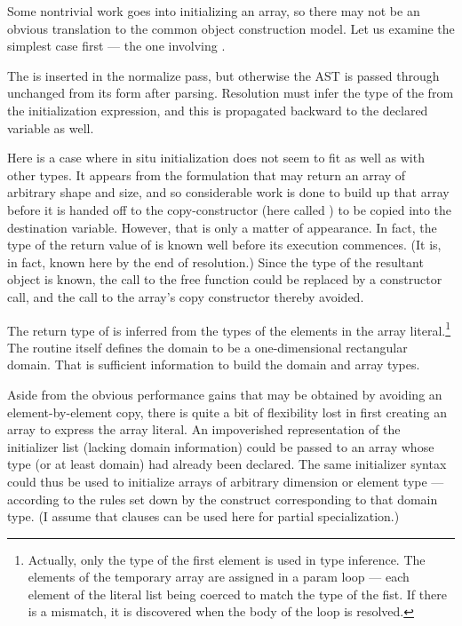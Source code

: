 Some nontrivial work goes into initializing an array, so there may not be an obvious
translation to the common object construction model.  Let us examine the simplest case
first --- the one involving .

The  is inserted in the normalize pass, but otherwise the AST is passed
through unchanged from its form after parsing.  Resolution must infer the type of the
 from the initialization expression, and this is propagated backward to the
declared variable as well.

Here is a case where in situ initialization does not seem to fit as well as with other
types.  It appears from the formulation that  may return an
array of arbitrary shape and size, and so considerable work is done to build up that array
before it is handed off to the copy-constructor (here called ) to be
copied into the destination variable.  However, that is only a matter of appearance.  In
fact, the type of the return value of  is known well before
its execution commences.  (It is, in fact, known here by the end of resolution.)  Since
the type of the resultant object is known, the call to the free function
 could be replaced by a constructor call, and the call to the
array's copy constructor thereby avoided.

The return type of  is inferred from the types of the
elements in the array literal.\footnote{Actually, only the type of the first element is
  used in type inference.  The elements of the temporary array are assigned in a param
  loop --- each element of the literal list being coerced to match the type of the fist.
  If there is a mismatch, it is discovered when the body of the loop is resolved.}  The
routine itself defines the domain to be a one-dimensional rectangular domain.  That is
sufficient information to build the domain and array types.

Aside from the obvious performance gains that may be obtained by avoiding an
element-by-element copy, there is quite a bit of flexibility lost in first creating an
array to express the array literal.  An impoverished representation of the initializer
list (lacking domain information) could be passed to an array whose type (or at least
domain) had already been declared.  The same initializer syntax could thus be used to
initialize arrays of arbitrary dimension or element type --- according to the rules set
down by the construct corresponding to that domain type.  (I assume that 
clauses can be used here for partial specialization.)  

